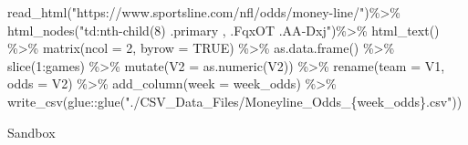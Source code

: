 \documentclass[
]{article}
\newenvironment{Shaded}{\begin{snugshade}}{\end{snugshade}}
\newcommand{\AttributeTok}[1]{\textcolor[rgb]{0.77,0.63,0.00}{#1}}
\newcommand{\ConstantTok}[1]{\textcolor[rgb]{0.00,0.00,0.00}{#1}}
\newcommand{\DecValTok}[1]{\textcolor[rgb]{0.00,0.00,0.81}{#1}}
\newcommand{\FunctionTok}[1]{\textcolor[rgb]{0.00,0.00,0.00}{#1}}
\newcommand{\NormalTok}[1]{#1}
\newcommand{\OtherTok}[1]{\textcolor[rgb]{0.56,0.35,0.01}{#1}}
\newcommand{\SpecialCharTok}[1]{\textcolor[rgb]{0.00,0.00,0.00}{#1}}
\newcommand{\StringTok}[1]{\textcolor[rgb]{0.31,0.60,0.02}{#1}}
\begin{document}
\begin{Shaded}
\begin{Highlighting}[]
\FunctionTok{read\_html}\NormalTok{(}\StringTok{"https://www.sportsline.com/nfl/odds/money{-}line/"}\NormalTok{)}\SpecialCharTok{\%\textgreater{}\%}
    \FunctionTok{html\_nodes}\NormalTok{(}\StringTok{"td:nth{-}child(8) .primary , .FqxOT .AA{-}Dxj"}\NormalTok{)}\SpecialCharTok{\%\textgreater{}\%}
    \FunctionTok{html\_text}\NormalTok{() }\SpecialCharTok{\%\textgreater{}\%} 
    \FunctionTok{matrix}\NormalTok{(}\AttributeTok{ncol =} \DecValTok{2}\NormalTok{, }\AttributeTok{byrow =} \ConstantTok{TRUE}\NormalTok{) }\SpecialCharTok{\%\textgreater{}\%}
    \FunctionTok{as.data.frame}\NormalTok{() }\SpecialCharTok{\%\textgreater{}\%} 
    \FunctionTok{slice}\NormalTok{(}\DecValTok{1}\SpecialCharTok{:}\NormalTok{games) }\SpecialCharTok{\%\textgreater{}\%} 
    \FunctionTok{mutate}\NormalTok{(}\AttributeTok{V2 =} \FunctionTok{as.numeric}\NormalTok{(V2)) }\SpecialCharTok{\%\textgreater{}\%} 
    \FunctionTok{rename}\NormalTok{(}\StringTok{\textasciigrave{}}\AttributeTok{team}\StringTok{\textasciigrave{}} \OtherTok{=}\NormalTok{ V1, }\StringTok{\textasciigrave{}}\AttributeTok{odds}\StringTok{\textasciigrave{}} \OtherTok{=}\NormalTok{ V2) }\SpecialCharTok{\%\textgreater{}\%} 
    \FunctionTok{add\_column}\NormalTok{(}\AttributeTok{week =}\NormalTok{ week\_odds) }\SpecialCharTok{\%\textgreater{}\%} 
    \FunctionTok{write\_csv}\NormalTok{(glue}\SpecialCharTok{::}\FunctionTok{glue}\NormalTok{(}\StringTok{"./CSV\_Data\_Files/Moneyline\_Odds\_\{week\_odds\}.csv"}\NormalTok{))}
\end{Highlighting}
\end{Shaded}

Sandbox
\end{document}
